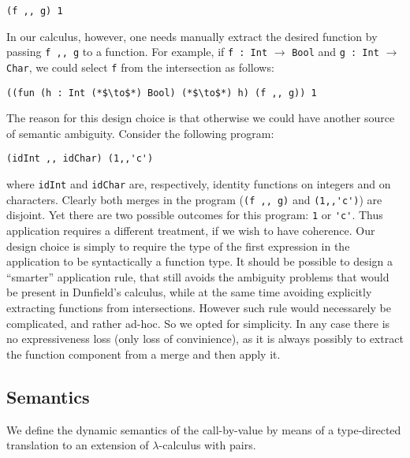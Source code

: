 \begin{lstlisting}
(f ,, g) 1
\end{lstlisting}

\noindent In our calculus, however, one needs manually extract the desired
function by passing \lstinline$f ,, g$ to a function. For example, if
\lstinline$f : Int$ $\to$  \lstinline$Bool$ and \lstinline$g : Int$ $\to$ \lstinline$Char$, we could select  \lstinline$f$
from the intersection as follows:

\begin{lstlisting}
((fun (h : Int (*$\to$*) Bool) (*$\to$*) h) (f ,, g)) 1
\end{lstlisting}

The reason for this design choice is that otherwise we could have
another source of semantic ambiguity. Consider the following program:

\begin{lstlisting} 
(idInt ,, idChar) (1,,'c')
\end{lstlisting}

\noindent where \lstinline$idInt$ and \lstinline$idChar$ are,
respectively, identity functions on integers and on characters. Clearly both
merges in the program (\lstinline$(f ,, g)$ and \lstinline$(1,,'c')$)
are disjoint. Yet there are two possible outcomes for this program: 
\lstinline$1$ or \lstinline$'c'$. Thus application requires a
different treatment, if we wish to have coherence.
Our design choice is simply to require the type 
of the first expression in the application to be syntactically a
function type. It should be possible to design a ``smarter''
application rule, that still avoids the ambiguity problems that would
be present in Dunfield's calculus, while at the same time avoiding 
explicitly extracting functions from intersections. However such rule 
would necessarely be complicated, and rather ad-hoc. 
So we opted for simplicity. In any case there is no expressiveness
loss (only loss of convinience), as it is always possibly to extract the function component from
a merge and then apply it.

\subsection{Semantics}

We define the dynamic semantics of the call-by-value \name by means of
a type-directed translation to an extension of $\lambda$-calculus with pairs.


